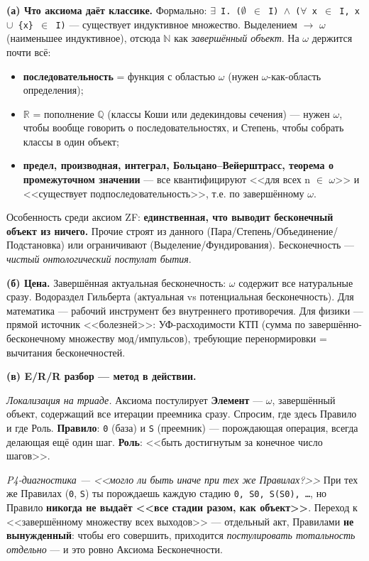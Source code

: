 \documentclass[11pt,a4paper]{article}
\begin{document}
\textbf{(а) Что аксиома даёт классике.} Формально: \texttt{$\exists$ I. ($\emptyset$ $\in$ I) $\land$ ($\forall$ x $\in$ I,\allowbreak{} x $\cup$ \{x\} $\in$ I)} --- существует индуктивное множество. Выделением $\to$ $\omega$ (наименьшее индуктивное), отсюда $\mathbb{N}$ как \emph{завершённый объект}. На $\omega$ держится почти всё:
\begin{itemize}
\item \textbf{последовательность} = функция с областью $\omega$ (нужен $\omega$-как-область определения);
\item \textbf{$\mathbb{R}$} = пополнение $\mathbb{Q}$ (классы Коши или дедекиндовы сечения) --- нужен $\omega$, чтобы вообще говорить о последовательностях, и Степень, чтобы собрать классы в один объект;
\item \textbf{предел, производная, интеграл, Больцано--Вейерштрасс, теорема о промежуточном значении} --- все квантифицируют <<для всех n $\in$ $\omega$>> и <<существует подпоследовательность>>, т.е. по завершённому $\omega$.
\end{itemize}

Особенность среди аксиом ZF: \textbf{единственная, что выводит бесконечный объект из ничего.} Прочие строят из данного (Пара/Степень/Объединение/Подстановка) или ограничивают (Выделение/Фундирования). Бесконечность --- \emph{чистый онтологический постулат бытия}.

\textbf{(б) Цена.} Завершённая актуальная бесконечность: $\omega$ содержит все натуральные сразу. Водораздел Гильберта (актуальная vs потенциальная бесконечность). Для математика --- рабочий инструмент без внутреннего противоречия. Для физики --- прямой источник <<болезней>>: УФ-расходимости КТП (сумма по завершённо-бесконечному множеству мод/импульсов), требующие перенормировки = вычитания бесконечностей.

\textbf{(в) E/R/R разбор --- метод в действии.}

\emph{Локализация на триаде.} Аксиома постулирует \textbf{Элемент} --- $\omega$, завершённый объект, содержащий все итерации преемника сразу. Спросим, где здесь Правило и где Роль. \textbf{Правило}: \texttt{0} (база) и \texttt{S} (преемник) --- порождающая операция, всегда делающая ещё один шаг. \textbf{Роль}: <<быть достигнутым за конечное число шагов>>.

\emph{P4-диагностика --- <<могло ли быть иначе при тех же Правилах?>>} При тех же Правилах (\texttt{0}, \texttt{S}) ты порождаешь каждую стадию \texttt{0,\allowbreak{} S0,\allowbreak{} S(S0),\allowbreak{} \ldots{}}, но Правило \textbf{никогда не выдаёт <<все стадии разом, как объект>>}. Переход к <<завершённому множеству всех выходов>> --- отдельный акт, Правилами \textbf{не вынужденный}: чтобы его совершить, приходится \emph{постулировать тотальность отдельно} --- и это ровно Аксиома Бесконечности.
\end{document}
